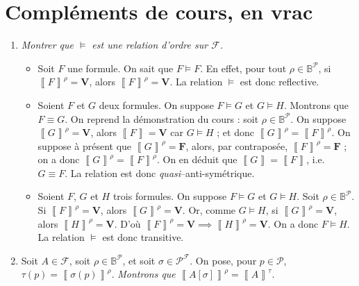 \section{Compléments de cours, en vrac}

\begin{enumerate}
	\item \textit{Montrer que $\models$\/ est une relation d'ordre sur $\mathcal{F}$.}
		\begin{itemize}
			\item Soit $F$\/ une formule. On sait que $F \models F$. En effet, pour tout $\rho \in \mathds{B}^{\mathcal{P}}$, si $\left\llbracket F \right\rrbracket^\rho = \mathbf{V}$, alors $\left\llbracket F \right\rrbracket^\rho = \mathbf{V}$. La relation $\models$\/ est donc reflective.
			\item Soient $F$\/ et $G$\/ deux formules. On suppose $F \models G$\/ et $G \models H$. Montrons que $F \equiv G$. On reprend la démonstration du cours : soit $\rho \in \mathds{B}^{\mathcal{P}}$. On suppose $\left\llbracket G \right\rrbracket^\rho = \mathbf{V}$, alors $\left\llbracket F \right\rrbracket = \mathbf{V}$\/ car $G \models H$ ; et donc $\left\llbracket G \right\rrbracket^\rho = \left\llbracket F \right\rrbracket^\rho$. On suppose à présent que $\left\llbracket G \right\rrbracket^\rho = \mathbf{F}$, alors, par contraposée, $\left\llbracket F \right\rrbracket^\rho = \mathbf{F}$ ; on a donc $\left\llbracket G \right\rrbracket^\rho = \left\llbracket F \right\rrbracket^\rho$. On en déduit que $\left\llbracket G \right\rrbracket = \left\llbracket F \right\rrbracket$, i.e.~$G \equiv F$. La relation est donc \textit{quasi}--anti-symétrique.
			\item Soient $F$, $G$\/ et $H$\/ trois formules. On suppose $F \models G$\/ et $G \models H$. Soit $\rho \in \mathds{B}^{\mathcal{P}}$. Si $\left\llbracket F \right\rrbracket^\rho = \mathbf{V}$, alors $\left\llbracket G \right\rrbracket^\rho = \mathbf{V}$. Or, comme $G \models H$, si $\left\llbracket G \right\rrbracket^\rho = \mathbf{V}$, alors $\left\llbracket H \right\rrbracket^\rho = \mathbf{V}$. D'où $\left\llbracket F \right\rrbracket^\rho = \mathbf{V} \implies\left\llbracket H \right\rrbracket^\rho = \mathbf{V}$. On a donc $F \models H$. La relation $\models$\/ est donc transitive.
		\end{itemize}
	\item Soit $A \in \mathcal{F}$, soit $\rho \in \mathds{B}^{\mathcal{P}}$, et soit $\sigma \in \mathcal{P}^\mathcal{F}$. On pose, pour $p \in \mathcal{P}$, $\tau(p) = \left\llbracket \sigma(p) \right\rrbracket^\rho$. \textit{Montrons que $\left\llbracket A[\sigma] \right\rrbracket^\rho = \left\llbracket A \right\rrbracket^\tau$}.
\end{enumerate}

